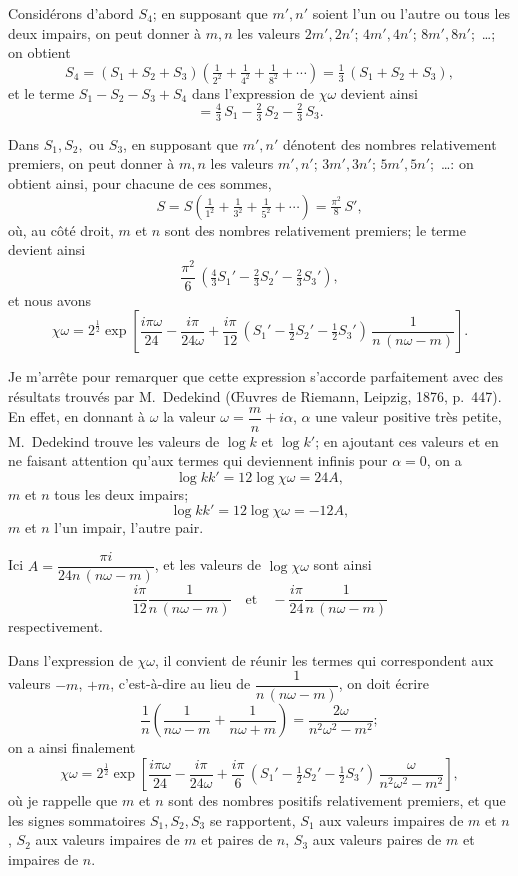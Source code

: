 \documentclass[11pt]{article}
\begin{document}
Consid\'erons d'abord $S_4$; en supposant que $m', n'$ soient l'un ou l'autre ou tous les deux impairs, on peut donner \`a $m, n$ les valeurs $2 m', 2 n'$; $4 m', 4 n'$; $8 m', 8 n'$;\ \ldots; on obtient
\[
S_4 = (S_1 + S_2 + S_3)\!\left(\tfrac{1}{2^2} + \tfrac{1}{4^2} + \tfrac{1}{8^2} + \cdots\right) = \tfrac{1}{3}\,(S_1 + S_2 + S_3),
\]
et le terme $S_1 - S_2 - S_3 + S_4$ dans l'expression de $\chi\omega$ devient ainsi
\[
= \tfrac{4}{3}\, S_1 - \tfrac{2}{3}\, S_2 - \tfrac{2}{3}\, S_3.
\]

Dans $S_1, S_2,$ ou $S_3$, en supposant que $m', n'$ d\'enotent des nombres relativement premiers, on peut donner \`a $m, n$ les valeurs $m', n'$; $3 m', 3 n'$; $5 m', 5 n'$;\ \ldots: on obtient ainsi, pour chacune de ces sommes,
\[
S = S\!\left(\tfrac{1}{1^2} + \tfrac{1}{3^2} + \tfrac{1}{5^2} + \cdots\right) = \tfrac{\pi^2}{8}\, S',
\]
o\`u, au c\^ot\'e droit, $m$ et $n$ sont des nombres relativement premiers; le terme devient ainsi
\[
\frac{\pi^2}{6}\,(\tfrac{4}{3} S_1' - \tfrac{2}{3} S_2' - \tfrac{2}{3} S_3'),
\]
et nous avons
\[
\chi\omega = 2^{\tfrac{1}{2}}\exp\!\left[\frac{i\pi\omega}{24} - \frac{i\pi}{24\omega} + \frac{i\pi}{12}\,(S_1' - \tfrac{1}{2} S_2' - \tfrac{1}{2} S_3')\,\frac{1}{n\,(n\omega - m)}\right].
\]

Je m'arr\^ete pour remarquer que cette expression s'accorde parfaitement avec des r\'esultats trouv\'es par M.\ Dedekind (\OE{}uvres de Riemann, Leipzig, 1876, p.\ 447). En effet, en donnant \`a $\omega$ la valeur $\omega = \dfrac{m}{n} + i\alpha$, $\alpha$ une valeur positive tr\`es petite, M.\ Dedekind trouve les valeurs de $\log k$ et $\log k'$; en ajoutant ces valeurs et en ne faisant attention qu'aux termes qui deviennent infinis pour $\alpha = 0$, on a
\[
\log k k' = 12\log\chi\omega = 24 A,
\]
$m$ et $n$ tous les deux impairs;
\[
\log k k' = 12\log\chi\omega = -12 A,
\]
$m$ et $n$ l'un impair, l'autre pair.

Ici $A = \dfrac{\pi i}{24 n\,(n\omega - m)}$, et les valeurs de $\log\chi\omega$ sont ainsi
\[
\frac{i\pi}{12}\frac{1}{n\,(n\omega - m)}\quad\text{et}\quad -\frac{i\pi}{24}\frac{1}{n\,(n\omega - m)}
\]
respectivement.

Dans l'expression de $\chi\omega$, il convient de r\'eunir les termes qui correspondent aux valeurs $-m$, $+m$, c'est-\`a-dire au lieu de $\dfrac{1}{n\,(n\omega - m)}$, on doit \'ecrire
\[
\frac{1}{n}\!\left(\frac{1}{n\omega - m} + \frac{1}{n\omega + m}\right) = \frac{2\omega}{n^2 \omega^2 - m^2};
\]
on a ainsi finalement
\[
\chi\omega = 2^{\tfrac{1}{2}}\exp\!\left[\frac{i\pi\omega}{24} - \frac{i\pi}{24\omega} + \frac{i\pi}{6}\,(S_1' - \tfrac{1}{2} S_2' - \tfrac{1}{2} S_3')\,\frac{\omega}{n^2 \omega^2 - m^2}\right],
\]
o\`u je rappelle que $m$ et $n$ sont des nombres positifs relativement premiers, et que les signes sommatoires $S_1, S_2, S_3$ se rapportent, $S_1$ aux valeurs impaires de $m$ et $n$, $S_2$ aux valeurs impaires de $m$ et paires de $n$, $S_3$ aux valeurs paires de $m$ et impaires de $n$.
\end{document}
